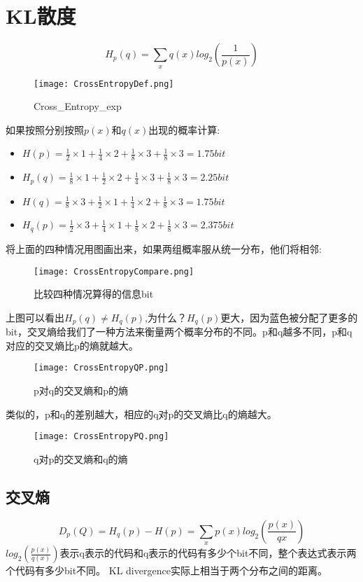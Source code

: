 \section{KL散度}
\begin{equation}
	H_p(q)=\sum_{x}q(x)log_2(\frac{1}{p(x)})
\end{equation}
\begin{figure}[H]
	\centering
	\texttt{[image: CrossEntropyDef.png]}
	\caption{Cross\_Entropy\_exp}
\end{figure}
如果按照分别按照$p(x)$和$q(x)$出现的概率计算:
\begin{itemize}
\item $H(p)=\frac{1}{2}\times 1+\frac{1}{4}\times 2+\frac{1}{8}\times 3+\frac{1}{8}\times 3=1.75bit$
\item $H_p(q)=\frac{1}{8}\times 1+\frac{1}{2}\times 2+\frac{1}{4}\times 3+\frac{1}{8}\times 3=2.25bit$
\item $H(q)=\frac{1}{8}\times 3+\frac{1}{2}\times 1+\frac{1}{4}\times 2+\frac{1}{8}\times 3= 1.75bit$
\item $H_q(p)=\frac{1}{2}\times 3+\frac{1}{4}\times 1+\frac{1}{8}\times 2+\frac{1}{8}\times 3 = 2.375bit$
\end{itemize}
将上面的四种情况用图画出来，如果两组概率服从统一分布，他们将相邻:
\begin{figure}[H]
	\centering
	\texttt{[image: CrossEntropyCompare.png]}
	\caption{比较四种情况算得的信息bit}
\end{figure}
上图可以看出$H_p(q)\neq H_q(p)$,为什么？$H_q(p)$更大，因为蓝色被分配了更多的bit，交叉熵给我们了一种方法来衡量两个概率分布的不同。p和q越多不同，p和q对应的交叉熵比p的熵就越大。
\begin{figure}[H]
	\centering
	\texttt{[image: CrossEntropyQP.png]}
	\caption{p对q的交叉熵和p的熵}
\end{figure}
类似的，p和q的差别越大，相应的q对p的交叉熵比q的熵越大。
\begin{figure}[H]
		\centering
			\texttt{[image: CrossEntropyPQ.png]}
				\caption{q对p的交叉熵和q的熵}
\end{figure}
\subsection{交叉熵}
\begin{equation}
	D_p(Q)=H_q(p)-H(p)=\sum_x p(x)log_2(\frac{p(x)}{q{x}})
\end{equation}
$log_2(\frac{p(x)}{q(x)})$表示q表示的代码和q表示的代码有多少个bit不同，整个表达式表示两个代码有多少bit不同。
KL divergence实际上相当于两个分布之间的距离。

